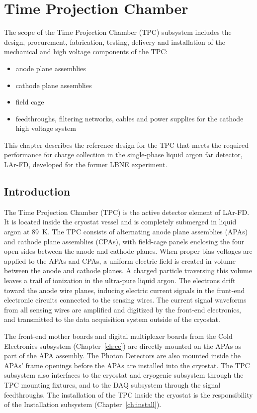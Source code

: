 \chapter{Time Projection Chamber}
\label{ch:tpc}

The scope of the Time Projection Chamber (TPC) subsystem includes the design, procurement, fabrication, testing, delivery and installation of the mechanical and high voltage components of the TPC: 
\begin{itemize}
\item anode plane assemblies 
\item cathode plane assemblies
\item field cage
\item feedthroughs, filtering networks, cables and power supplies for the cathode high voltage system
\end{itemize}
This chapter describes the reference design for the TPC that meets the required performance for charge 
collection in the single-phase liquid argon far detector, LAr-FD, developed for the former LBNE experiment.

\section{Introduction}

The Time Projection Chamber (TPC) is the active detector element of LAr-FD. It is located inside the cryostat 
vessel and is completely submerged in liquid argon at 89~K. The TPC consists of alternating anode plane 
assemblies (APAs) and cathode plane assemblies (CPAs), with field-cage panels enclosing the four open sides between the anode and cathode planes.
When proper bias voltages are applied to the APAs and CPAs, a uniform electric field is created in volume between the anode and cathode planes. A charged particle traversing this volume leaves a trail of 
ionization in the ultra-pure liquid argon.  The electrons drift toward the anode wire planes, inducing electric current signals in the front-end electronic circuits connected to the sensing wires.  The current 
signal waveforms from all sensing wires are amplified and digitized by the front-end electronics, and transmitted to the data acquisition system outside of the cryostat.

The front-end mother boards and digital multiplexer boards from the Cold Electronics subsystem (Chapter~\ref{ch:ce}) are directly mounted on the APAs as part of the APA assembly.  The Photon Detectors are also mounted 
inside the APAs' frame openings before the APAs are installed into the cryostat. The TPC subsystem also interfaces to the cryostat and cryogenic subsystem through the TPC mounting fixtures, and to the DAQ 
subsystem through the signal feedthroughs.  The installation of the TPC inside the cryostat is the responsibility of the Installation subsystem (Chapter~\ref{ch:install}).


